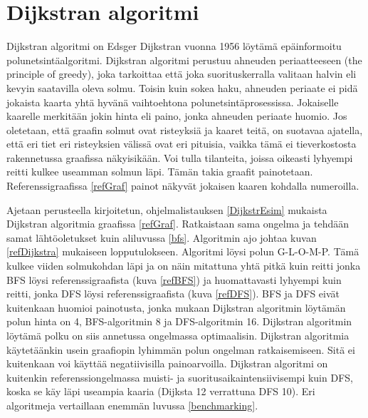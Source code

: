 \section{Dijkstran algoritmi}\label{dijkstra}
Dijkstran algoritmi on Edsger Dijkstran vuonna 1956 löytämä epäinformoitu 
polunetsintäalgoritmi.\cite{applSciLawande} Dijkstran algoritmi perustuu 
ahneuden periaatteeseen (the principle of greedy), joka tarkoittaa että joka 
suorituskerralla valitaan halvin eli kevyin saatavilla oleva 
solmu.\cite{mazeGameTrilogi} Toisin kuin sokea haku, ahneuden periaate ei pidä 
jokaista kaarta yhtä hyvänä vaihtoehtona polunetsintäprosessissa. Jokaiselle 
kaarelle merkitään jokin hinta eli paino, jonka ahneuden periaate huomio. Jos 
oletetaan, että graafin solmut ovat risteyksiä ja kaaret teitä, on suotavaa 
ajatella, että eri tiet eri risteyksien välissä ovat eri pituisia, vaikka tämä 
ei tieverkostosta rakennetussa graafissa näkyisikään. Voi tulla tilanteita, 
joissa oikeasti lyhyempi reitti kulkee useamman solmun läpi. Tämän takia 
graafit painotetaan. Referenssigraafissa \ref{refGraf} painot näkyvät jokaisen 
kaaren kohdalla numeroilla. \par
	Ajetaan \textcite{applSciLawande} perusteella kirjoitetun, 
ohjelmalistauksen \ref{DijkstrEsim} mukaista Dijkstran algoritmia graafissa 
\ref{refGraf}. Ratkaistaan sama ongelma ja tehdään samat lähtöoletukset kuin 
aliluvussa \ref{bfs}. Algoritmin ajo johtaa kuvan \ref{refDijkstra} mukaiseen 
lopputulokseen. Algoritmi löysi polun G-L-O-M-P. Tämä kulkee viiden 
solmukohdan läpi ja on näin mitattuna yhtä pitkä kuin reitti jonka BFS löysi 
referenssigraafista (kuva \ref{refBFS}) ja huomattavasti lyhyempi kuin 
reitti, jonka DFS löysi referenssigraafista (kuva \ref{refDFS}). BFS ja DFS 
eivät kuitenkaan huomioi painotusta, jonka mukaan Dijkstran algoritmin 
löytämän polun hinta on 4, BFS-algoritmin 8 ja DFS-algoritmin 16. Dijkstran 
algoritmin löytämä polku on siis annetussa ongelmassa optimaalisin. Dijkstran 
algoritmia käytetäänkin usein graafiopin lyhimmän polun ongelman 
ratkaisemiseen.\cite{IOPDijkstra} Sitä ei kuitenkaan voi käyttää 
negatiivisilla painoarvoilla.\cite{applSciLawande} Dijkstran algoritmi on 
kuitenkin referenssiongelmassa muisti- ja suoritusaikaintensiivisempi kuin 
DFS, koska se käy läpi useampia kaaria (Dijksta 12 verrattuna DFS 10). Eri 
algoritmeja vertaillaan enemmän luvussa \ref{benchmarking}.

